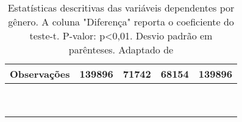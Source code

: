 \begin{table}[h]
\begin{tabular}{lcccc}
    Observações                                       & 139896                                                   & 71742                                                    & 68154                                                    & 139896               \\ \hline
                                                      & \multicolumn{1}{l}{}                                     & \multicolumn{1}{l}{}                                     & \multicolumn{1}{l}{}                                     & \multicolumn{1}{l}{} \\
                                                      & \multicolumn{1}{l}{}                                     & \multicolumn{1}{l}{}                                     & \multicolumn{1}{l}{}                                     & \multicolumn{1}{l}{} \\
                                                      & \multicolumn{1}{l}{}                                     & \multicolumn{1}{l}{}                                     & \multicolumn{1}{l}{}                                     & \multicolumn{1}{l}{} \\
                                                      & \multicolumn{1}{l}{}                                     & \multicolumn{1}{l}{}                                     & \multicolumn{1}{l}{}                                     & \multicolumn{1}{l}{} \\
                                                      & \multicolumn{1}{l}{}                                     & \multicolumn{1}{l}{}                                     & \multicolumn{1}{l}{}                                     & \multicolumn{1}{l}{} \\
                                                      & \multicolumn{1}{l}{}                                     & \multicolumn{1}{l}{}                                     & \multicolumn{1}{l}{}                                     & \multicolumn{1}{l}{} \\
                                                      & \multicolumn{1}{l}{}                                     & \multicolumn{1}{l}{}                                     & \multicolumn{1}{l}{}                                     & \multicolumn{1}{l}{} \\
                                                      & \multicolumn{1}{l}{}                                     & \multicolumn{1}{l}{}                                     & \multicolumn{1}{l}{}                                     & \multicolumn{1}{l}{} \\
                                                      & \multicolumn{1}{l}{}                                     & \multicolumn{1}{l}{}                                     & \multicolumn{1}{l}{}                                     & \multicolumn{1}{l}{}
    \end{tabular}
    \caption{Estatísticas descritivas das variáveis dependentes por gênero. A coluna "Diferença"  reporta o coeficiente do teste-t. P-valor: p<0,01. Desvio padrão em parênteses. Adaptado de \citet{Borges2021}}
    \label{tab:resultados-borges}
    \end{table}

